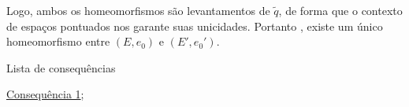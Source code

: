 \begin{dem}
    Logo, ambos os homeomorfismos são levantamentos de $\tilde q$, de forma que o contexto de espaços pontuados nos garante suas unicidades. Portanto  , existe um único homeomorfismo entre $(E, e_0)$ e $(E', e_0')$.
\end{dem}

\begin{titlemize}{Lista de consequências}
	\item \hyperref[consequencia1]{Consequência 1};\\ %
	\item \hyperref[]{}
\end{titlemize}